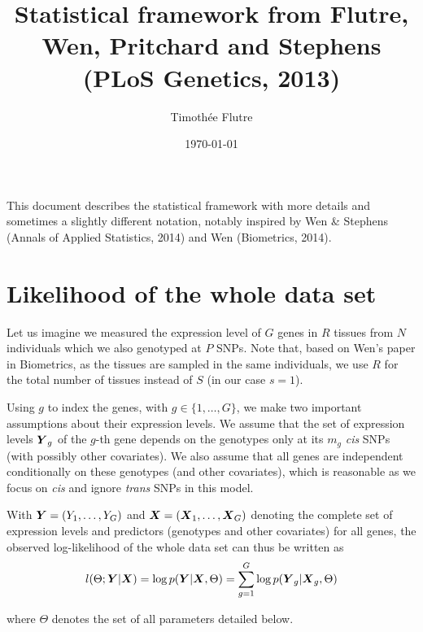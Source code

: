 \documentclass[10pt]{article}
\newcommand{\Xv}{\mbox{\boldmath$X$}}
\newcommand{\Yv}{\mbox{\boldmath$Y$}}
\begin{document}
\title{Statistical framework from Flutre, Wen, Pritchard and Stephens (PLoS Genetics, 2013)}
\author{Timoth\'{e}e Flutre}
\date{\today}

\maketitle

\tableofcontents

\vspace{1cm}

This document describes the statistical framework with more details and sometimes a slightly different notation, notably inspired by Wen \& Stephens (Annals of Applied Statistics, 2014) and Wen (Biometrics, 2014).



\section{Likelihood of the whole data set}

Let us imagine we measured the expression level of $G$ genes in $R$ tissues from $N$ individuals which we also genotyped at $P$ SNPs.
Note that, based on Wen's paper in Biometrics, as the tissues are sampled in the same individuals, we use $R$ for the total number of tissues instead of $S$ (in our case $s=1$).

Using $g$ to index the genes, with $g \in \{1,\dots,G\}$, we make two important assumptions about their expression levels.
We assume that the set of expression levels $\Yv_g$ of the $g$-th gene depends on the genotypes only at its $m_g$ \textit{cis} SNPs (with possibly other covariates).
We also assume that all genes are independent conditionally on these genotypes (and other covariates), which is reasonable as we focus on \textit{cis} and ignore \textit{trans} SNPs in this model.

With $\Yv = (Y_1, \dots, Y_G)$ and $\Xv = (\Xv_1, \dots, \Xv_G)$ denoting the complete set of expression levels and predictors (genotypes and other covariates) for all genes, the observed log-likelihood of the whole data set can thus be written as
\begin{equation}
  \label{lobs}
  l(\Theta; \Yv | \Xv) = \log p(\Yv | \Xv, \Theta) = \sum_{g=1}^G \log p(\Yv_g | \Xv_g, \Theta)
\end{equation}

where $\Theta$ denotes the set of all parameters detailed below.
\end{document}
